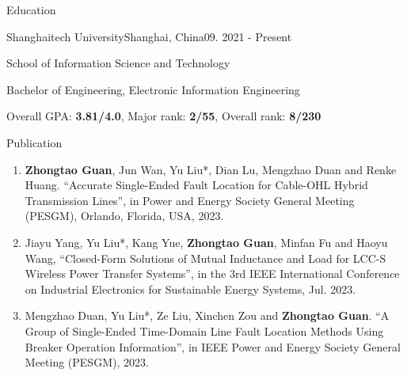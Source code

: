 \documentclass[]{ZhongtaoGuan-CV}
\begin{document}
\resumeheader
{}
{}
{}
{}
{}

\begin{section}{Education}
 \begin{subsectionnobullet}{Shanghaitech University}{Shanghai, China}{09. 2021 - Present}{}
     \item {School of Information Science and Technology}
     \item{Bachelor of Engineering, Electronic Information Engineering}
     \item{Overall GPA: \textbf{3.81/4.0}, Major rank: \textbf{2/55}, Overall rank: \textbf{8/230}}
 \end{subsectionnobullet}
\end{section}

\begin{section}{Publication}
 \begin{enumerate}
     \item \textbf{Zhongtao Guan}, Jun Wan, Yu Liu*, Dian Lu, Mengzhao Duan and Renke Huang. “Accurate Single-Ended Fault Location for Cable-OHL Hybrid Transmission Lines”, in Power and Energy Society General Meeting (PESGM), Orlando, Florida, USA, 2023. %
     \item Jiayu Yang, Yu Liu*, Kang Yue, \textbf{Zhongtao Guan}, Minfan Fu and Haoyu Wang, “Closed-Form Solutions of Mutual Inductance and Load for LCC-S Wireless Power Transfer Systems”, in the 3rd IEEE International Conference on Industrial Electronics for Sustainable Energy Systems, Jul. 2023.
     \item Mengzhao Duan, Yu Liu*, Ze Liu, Xinchen Zou and \textbf{Zhongtao Guan}. “A Group of Single-Ended Time-Domain Line Fault Location Methods Using Breaker Operation Information”, in IEEE Power and Energy Society General Meeting (PESGM), 2023.%
    \end{enumerate}
\end{section}
\end{document}
